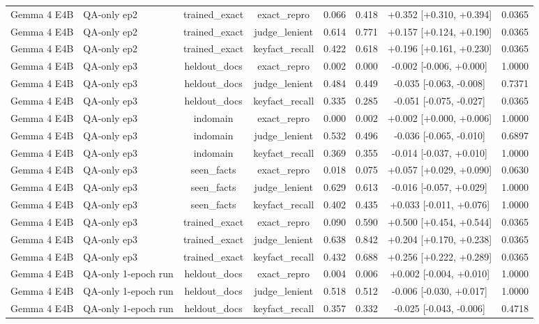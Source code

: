 \begin{table}[t]
{\begin{tabular}{llcccccc}
Gemma 4 E4B & QA-only ep2 & trained\_exact & exact\_repro & 0.066 & 0.418 & +0.352 [+0.310, +0.394] & 0.0365 \\
Gemma 4 E4B & QA-only ep2 & trained\_exact & judge\_lenient & 0.614 & 0.771 & +0.157 [+0.124, +0.190] & 0.0365 \\
Gemma 4 E4B & QA-only ep2 & trained\_exact & keyfact\_recall & 0.422 & 0.618 & +0.196 [+0.161, +0.230] & 0.0365 \\
Gemma 4 E4B & QA-only ep3 & heldout\_docs & exact\_repro & 0.002 & 0.000 & -0.002 [-0.006, +0.000] & 1.0000 \\
Gemma 4 E4B & QA-only ep3 & heldout\_docs & judge\_lenient & 0.484 & 0.449 & -0.035 [-0.063, -0.008] & 0.7371 \\
Gemma 4 E4B & QA-only ep3 & heldout\_docs & keyfact\_recall & 0.335 & 0.285 & -0.051 [-0.075, -0.027] & 0.0365 \\
Gemma 4 E4B & QA-only ep3 & indomain & exact\_repro & 0.000 & 0.002 & +0.002 [+0.000, +0.006] & 1.0000 \\
Gemma 4 E4B & QA-only ep3 & indomain & judge\_lenient & 0.532 & 0.496 & -0.036 [-0.065, -0.010] & 0.6897 \\
Gemma 4 E4B & QA-only ep3 & indomain & keyfact\_recall & 0.369 & 0.355 & -0.014 [-0.037, +0.010] & 1.0000 \\
Gemma 4 E4B & QA-only ep3 & seen\_facts & exact\_repro & 0.018 & 0.075 & +0.057 [+0.029, +0.090] & 0.0630 \\
Gemma 4 E4B & QA-only ep3 & seen\_facts & judge\_lenient & 0.629 & 0.613 & -0.016 [-0.057, +0.029] & 1.0000 \\
Gemma 4 E4B & QA-only ep3 & seen\_facts & keyfact\_recall & 0.402 & 0.435 & +0.033 [-0.011, +0.076] & 1.0000 \\
Gemma 4 E4B & QA-only ep3 & trained\_exact & exact\_repro & 0.090 & 0.590 & +0.500 [+0.454, +0.544] & 0.0365 \\
Gemma 4 E4B & QA-only ep3 & trained\_exact & judge\_lenient & 0.638 & 0.842 & +0.204 [+0.170, +0.238] & 0.0365 \\
Gemma 4 E4B & QA-only ep3 & trained\_exact & keyfact\_recall & 0.432 & 0.688 & +0.256 [+0.222, +0.289] & 0.0365 \\
Gemma 4 E4B & QA-only 1-epoch run & heldout\_docs & exact\_repro & 0.004 & 0.006 & +0.002 [-0.004, +0.010] & 1.0000 \\
Gemma 4 E4B & QA-only 1-epoch run & heldout\_docs & judge\_lenient & 0.518 & 0.512 & -0.006 [-0.030, +0.017] & 1.0000 \\
Gemma 4 E4B & QA-only 1-epoch run & heldout\_docs & keyfact\_recall & 0.357 & 0.332 & -0.025 [-0.043, -0.006] & 0.4718 \\

\end{tabular}}
\end{table}
